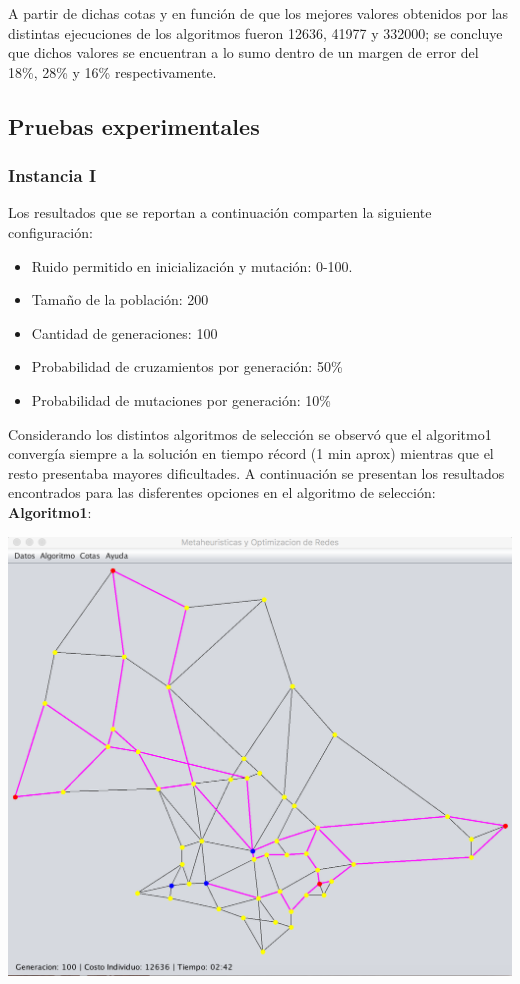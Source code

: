 \documentclass{extarticle}
\begin{document}
A partir de dichas cotas y en función de que los mejores valores obtenidos por las distintas ejecuciones de los algoritmos fueron 12636, 41977 y 332000; se concluye que dichos valores se encuentran a lo sumo dentro de un margen de error del 18\%, 28\% y 16\% respectivamente.
\subsection{Pruebas experimentales}
\subsubsection{Instancia I}
Los resultados que se reportan a continuación comparten la siguiente configuración:
\begin{itemize}
	\item Ruido permitido en inicialización y mutación: 0-100.
	\item Tamaño de la población: 200
	\item Cantidad de generaciones: 100
	\item Probabilidad de cruzamientos por generación: 50\%
	\item Probabilidad de mutaciones por generación: 10\%
\end{itemize}
Considerando los distintos algoritmos de selección se observó que el algoritmo1 convergía siempre a la solución en tiempo récord (1 min aprox) mientras que el resto presentaba mayores dificultades. A continuación se presentan los resultados encontrados para las disferentes opciones en el algoritmo de selección:
\newpage
\textbf{Algoritmo1}:
\begin{center}
	\includegraphics[scale=0.4]{img/metaheuristica/i1_s1}
\end{center}
\end{document}
